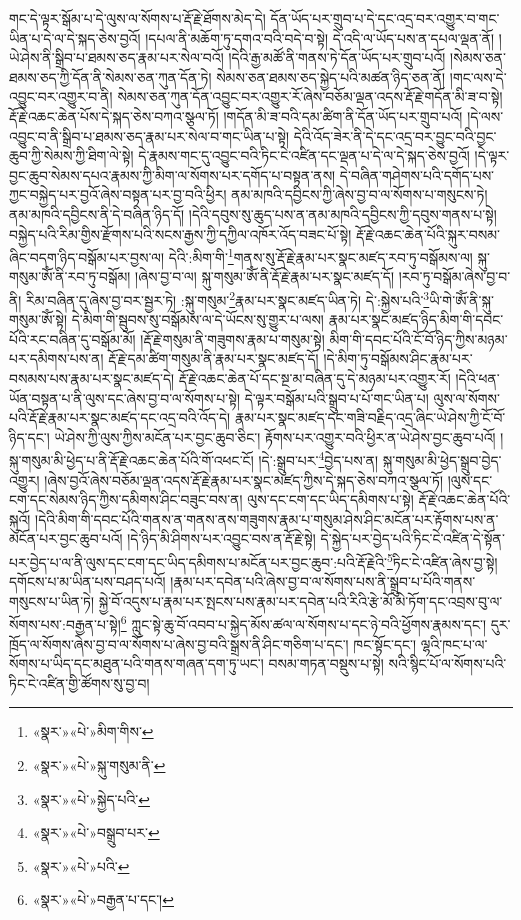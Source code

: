 གང་དེ་ལྟར་སྒོམ་པ་དེ་ལུས་ལ་སོགས་པ་རྡོ་རྗེ་ཐོགས་མེད་དེ། དོན་ཡོད་པར་གྲུབ་པ་དེ་དང་འདྲ་བར་འགྱུར་བ་གང་ཡིན་པ་དེ་ལ་དེ་སྐད་ཅེས་བྱའོ། །དཔལ་ནི་མཆོག་ཏུ་དགའ་བའི་བདེ་བ་སྟེ། དེ་འདི་ལ་ཡོད་པས་ན་དཔལ་ལྡན་ནོ། །ཡེ་ཤེས་ནི་སྒྲིབ་པ་ཐམས་ཅད་རྣམ་པར་སེལ་བའོ། །དེའི་རྒྱ་མཚོ་ནི་གནས་ཏེ་དོན་ཡོད་པར་གྲུབ་པའོ། །སེམས་ཅན་ཐམས་ཅད་ཀྱི་དོན་ནི་སེམས་ཅན་ཀུན་དོན་ཏེ། སེམས་ཅན་ཐམས་ཅད་སྐྱེད་པའི་མཚན་ཉིད་ཅན་ནོ། །གང་ལས་དེ་འབྱུང་བར་འགྱུར་བ་ནི། སེམས་ཅན་ཀུན་དོན་འབྱུང་བར་འགྱུར་རོ་ཞེས་བཅོམ་ལྡན་འདས་རྡོ་རྗེ་གདོན་མི་ཟ་བ་སྟེ། རྡོ་རྗེ་འཆང་ཆེན་པོས་དེ་སྐད་ཅེས་བཀའ་སྩལ་ཏོ། །གདོན་མི་ཟ་བའི་དམ་ཚིག་ནི་དོན་ཡོད་པར་གྲུབ་པའོ། །དེ་ལས་འབྱུང་བ་ནི་སྒྲིབ་པ་ཐམས་ཅད་རྣམ་པར་སེལ་བ་གང་ཡིན་པ་སྟེ། དེའི་འོད་ཟེར་ནི་དེ་དང་འདྲ་བར་བྱུང་བའི་བྱང་ཆུབ་ཀྱི་སེམས་ཀྱི་ཐིག་ལེ་སྟེ། དེ་རྣམས་གང་དུ་འབྱུང་བའི་ཏིང་ངེ་འཛིན་དང་ལྡན་པ་དེ་ལ་དེ་སྐད་ཅེས་བྱའོ། །དེ་ལྟར་བྱང་ཆུབ་སེམས་དཔའ་རྣམས་ཀྱི་མིག་ལ་སོགས་པར་དགོད་པ་བསྟན་ནས། དེ་བཞིན་གཤེགས་པའི་དགོད་པས་ཀྱང་བསྐྱེད་པར་བྱའོ་ཞེས་བསྟན་པར་བྱ་བའི་ཕྱིར། ནམ་མཁའི་དབྱིངས་ཀྱི་ཞེས་བྱ་བ་ལ་སོགས་པ་གསུངས་ཏེ། ནམ་མཁའི་དབྱིངས་ནི་དེ་བཞིན་ཉིད་དོ། །དེའི་དབུས་སུ་ཆུད་པས་ན་ནམ་མཁའི་དབྱིངས་ཀྱི་དབུས་གནས་པ་སྟེ། བསྐྱེད་པའི་རིམ་གྱིས་རྫོགས་པའི་སངས་རྒྱས་ཀྱི་དཀྱིལ་འཁོར་འོད་བཟང་པོ་སྟེ། རྡོ་རྗེ་འཆང་ཆེན་པོའི་སྐུར་བསམ་ཞིང་བདག་ཉིད་བསྒོམ་པར་བྱས་ལ། དེའི་:མིག་གི་\footnote{«སྣར་»«པེ་»མིག་གིས་}གནས་སུ་རྡོ་རྗེ་རྣམ་པར་སྣང་མཛད་རབ་ཏུ་བསྒོམས་ལ། སྐུ་གསུམ་ཨོཾ་ནི་རབ་ཏུ་བསྒོམ། །ཞེས་བྱ་བ་ལ། སྐུ་གསུམ་ཨོཾ་ནི་རྡོ་རྗེ་རྣམ་པར་སྣང་མཛད་དོ། །རབ་ཏུ་བསྒོམ་ཞེས་བྱ་བ་ནི། རིམ་བཞིན་དུ་ཞེས་བྱ་བར་སྦྱར་ཏེ། :སྐུ་གསུམ་\footnote{«སྣར་»«པེ་»སྐུ་གསུམ་ནི་}རྣམ་པར་སྣང་མཛད་ཡིན་ཏེ། དེ་:སྐྱེས་པའི་\footnote{«སྣར་»«པེ་»སྐྱེད་པའི་}ཡི་གེ་ཨོཾ་ནི་སྐུ་གསུམ་ཨོཾ་སྟེ། དེ་མིག་གི་སྦུབས་སུ་བསྒོམས་ལ་དེ་ཡོངས་སུ་གྱུར་པ་ལས། རྣམ་པར་སྣང་མཛད་ཉིད་མིག་གི་དབང་པོའི་རང་བཞིན་དུ་བསྒོམ་མོ། །རྡོ་རྗེ་གསུམ་ནི་གཟུགས་རྣམ་པ་གསུམ་སྟེ། མིག་གི་དབང་པོའི་ངོ་བོ་ཉིད་ཀྱིས་མཉམ་པར་དམིགས་པས་ན། རྡོ་རྗེ་དམ་ཚིག་གསུམ་ནི་རྣམ་པར་སྣང་མཛད་དོ། །དེ་མིག་ཏུ་བསྒོམས་ཤིང་རྣམ་པར་བསམས་པས་རྣམ་པར་སྣང་མཛད་དེ། རྡོ་རྗེ་འཆང་ཆེན་པོ་དང་སྔ་མ་བཞིན་དུ་དེ་མཉམ་པར་འགྱུར་རོ། །དེའི་ཕན་ཡོན་བསྟན་པ་ནི་ལུས་དང་ཞེས་བྱ་བ་ལ་སོགས་པ་སྟེ། དེ་ལྟར་བསྒོམ་པའི་སྒྲུབ་པ་པོ་གང་ཡིན་པ། ལུས་ལ་སོགས་པའི་རྡོ་རྗེ་རྣམ་པར་སྣང་མཛད་དང་འདྲ་བའི་འོད་དེ། རྣམ་པར་སྣང་མཛད་དང་གཟི་བརྗིད་འདྲ་ཞིང་ཡེ་ཤེས་ཀྱི་ངོ་བོ་ཉིད་དང་། ཡེ་ཤེས་ཀྱི་ལུས་ཀྱིས་མངོན་པར་བྱང་ཆུབ་ཅིང་། རྟོགས་པར་འགྱུར་བའི་ཕྱིར་ན་ཡེ་ཤེས་བྱང་ཆུབ་པའོ། །སྐུ་གསུམ་མི་ཕྱེད་པ་ནི་རྡོ་རྗེ་འཆང་ཆེན་པོའི་གོ་འཕང་ངོ། །དེ་:སྒྲུབ་པར་\footnote{«སྣར་»«པེ་»བསྒྲུབ་པར་}བྱེད་པས་ན། སྐུ་གསུམ་མི་ཕྱེད་སྒྲུབ་བྱེད་འགྱུར། །ཞེས་བྱའོ་ཞེས་བཅོམ་ལྡན་འདས་རྡོ་རྗེ་རྣམ་པར་སྣང་མཛད་ཀྱིས་དེ་སྐད་ཅེས་བཀའ་སྩལ་ཏོ། །ལུས་དང་ངག་དང་སེམས་ཉིད་ཀྱིས་དམིགས་ཤིང་བཟུང་བས་ན། ལུས་དང་ངག་དང་ཡིད་དམིགས་པ་སྟེ། རྡོ་རྗེ་འཆང་ཆེན་པོའི་སྐུའོ། །དེའི་མིག་གི་དབང་པོའི་གནས་ན་གནས་ནས་གཟུགས་རྣམ་པ་གསུམ་ཤེས་ཤིང་མངོན་པར་རྟོགས་པས་ན་མངོན་པར་བྱང་ཆུབ་པའོ། །དེ་ཉིད་མི་ཤིགས་པར་འབྱུང་བས་ན་རྡོ་རྗེ་སྟེ། དེ་སྐྱེད་པར་བྱེད་པའི་ཏིང་ངེ་འཛིན་དེ་སྟོན་པར་བྱེད་པ་ལ་ནི་ལུས་དང་ངག་དང་ཡིད་དམིགས་པ་མངོན་པར་བྱང་ཆུབ་:པའི་རྡོ་རྗེའི་\footnote{«སྣར་»«པེ་»པའི་}ཏིང་ངེ་འཛིན་ཞེས་བྱ་སྟེ། དགོངས་པ་མ་ཡིན་པས་བཤད་པའོ། །རྣམ་པར་དབེན་པའི་ཞེས་བྱ་བ་ལ་སོགས་པས་ནི་སྒྲུབ་པ་པོའི་གནས་གསུངས་པ་ཡིན་ཏེ། སྐྱེ་བོ་འདུས་པ་རྣམ་པར་སྤངས་པས་རྣམ་པར་དབེན་པའི་རིའི་རྩེ་མོ་མེ་ཏོག་དང་འབྲས་བུ་ལ་སོགས་པས་:བརྒྱན་པ་སྟེ།\footnote{«སྣར་»«པེ་»བརྒྱན་པ་དང་།} ཀླུང་སྟེ་ཆུ་བོ་འབབ་པ་སྐྱེད་མོས་ཚལ་ལ་སོགས་པ་དང་ཉེ་བའི་ཕྱོགས་རྣམས་དང་། དུར་ཁྲོད་ལ་སོགས་ཞེས་བྱ་བ་ལ་སོགས་པ་ཞེས་བྱ་བའི་སྒྲས་ནི་ཤིང་གཅིག་པ་དང་། ཁང་སྟོང་དང་། ལྷའི་ཁང་པ་ལ་སོགས་པ་ཡིད་དང་མཐུན་པའི་གནས་གཞན་དག་ཏུ་ཡང་། བསམ་གཏན་བསྡུས་པ་སྟེ། སའི་སྙིང་པོ་ལ་སོགས་པའི་ཏིང་ངེ་འཛིན་གྱི་ཚོགས་སུ་བྱ་བ། 